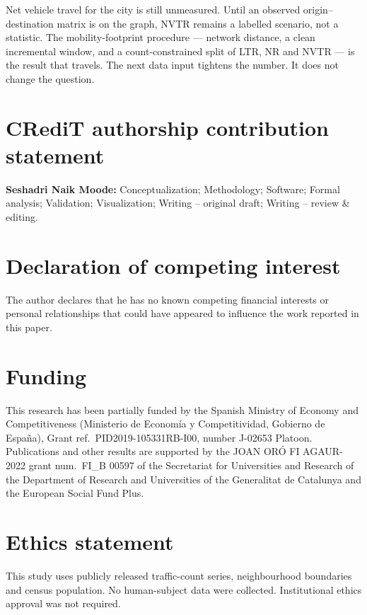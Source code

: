 \documentclass[a4paper,fleqn]{cas-dc}
\begin{document}
Net vehicle travel for the city is still unmeasured. Until an observed
origin--destination matrix is on the graph, NVTR remains a labelled scenario,
not a statistic. The mobility-footprint procedure --- network distance, a
clean incremental window, and a count-constrained split of LTR, NR and NVTR
--- is the result that travels. The next data input tightens the number. It
does not change the question.

\section*{CRediT authorship contribution statement}

\noindent\textbf{Seshadri Naik Moode:} Conceptualization; Methodology;
Software; Formal analysis; Validation; Visualization; Writing -- original
draft; Writing -- review \& editing.

\section*{Declaration of competing interest}

The author declares that he has no known competing financial interests or
personal relationships that could have appeared to influence the work reported
in this paper.

\section*{Funding}

This research has been partially funded by the Spanish Ministry of Economy
and Competitiveness (Ministerio de Econom\'{i}a y Competitividad, Gobierno
de Espa\~{n}a), Grant ref.\ PID2019-105331RB-I00, number J-02653 Platoon.
Publications and other results are supported by the JOAN OR\'{O} FI
AGAUR-2022 grant num.\ FI\_B 00597 of the Secretariat for Universities and
Research of the Department of Research and Universities of the Generalitat
de Catalunya and the European Social Fund Plus.

\section*{Ethics statement}

This study uses publicly released traffic-count series, neighbourhood
boundaries and census population. No human-subject data were collected.
Institutional ethics approval was not required.
\end{document}
